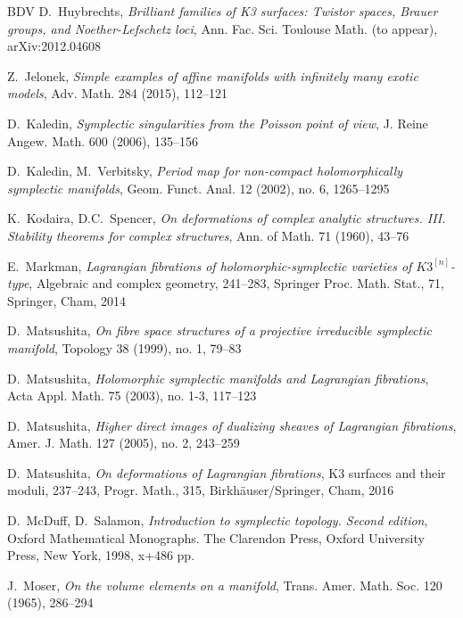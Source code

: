 \documentclass[10pt]{amsart}
\begin{document}
\begin{thebibliography}{BDV}
D.\ Huybrechts, {\it Brilliant families of K3 surfaces: Twistor spaces, Brauer groups, and Noether-Lefschetz loci},
Ann. Fac. Sci. Toulouse Math. (to appear), arXiv:2012.04608


Z.\ Jelonek, {\it Simple examples of affine manifolds with infinitely many exotic models},
Adv. Math. 284 (2015), 112--121

D.\ Kaledin, {\it Symplectic singularities from the Poisson point of view},
J. Reine Angew. Math. 600 (2006), 135--156

D.\ Kaledin, M.\ Verbitsky, {\it Period map for non-compact holomorphically symplectic ma\-nifolds},
Geom. Funct. Anal. 12 (2002), no. 6, 1265--1295

K.\ Kodaira, D.C.\ Spencer, {\it On deformations of complex analytic structures. III.
Stability theorems for complex structures}, Ann. of Math. 71 (1960), 43--76

E.\ Markman, {\it Lagrangian fibrations of holomorphic-symplectic varieties of $K3^{[n]}$-type},
Algebraic and complex geometry, 241--283, Springer Proc. Math. Stat., 71, Springer, Cham, 2014

D.\ Matsushita, {\it On fibre space structures of a projective irreducible symplectic manifold},
Topology 38 (1999), no. 1, 79--83

D.\ Matsushita, {\it Holomorphic symplectic manifolds and Lagrangian fibrations},
Acta Appl. Math. 75 (2003), no. 1-3, 117--123

D.\ Matsushita, {\it Higher direct images of dualizing sheaves of Lagrangian fibrations},
Amer. J. Math. 127 (2005), no. 2, 243--259

D.\ Matsushita, {\it On deformations of Lagrangian fibrations},
K3 surfaces and their moduli, 237–243, Progr. Math., 315, Birkh\"auser/Springer, Cham, 2016

D.\ McDuff, D.\ Salamon, {\it Introduction to symplectic topology. Second edition},
Oxford Mathematical Monographs. The Clarendon Press, Oxford University Press, New York, 1998, x+486 pp.

J.\ Moser, {\it On the volume elements on a manifold},
Trans. Amer. Math. Soc. 120 (1965), 286--294


\end{thebibliography}
\end{document}
